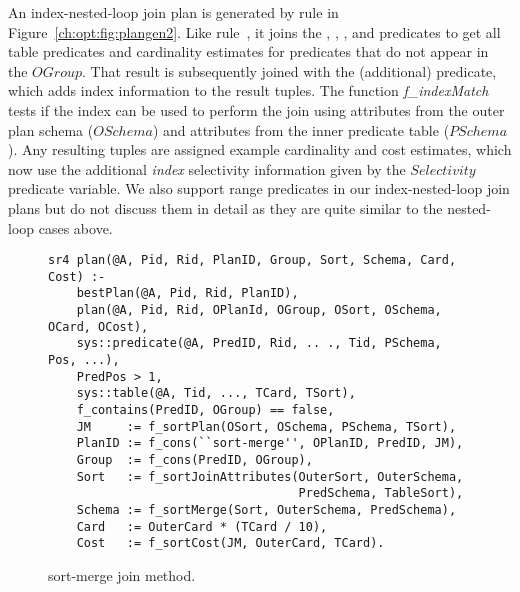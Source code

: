 An index-nested-loop join plan is generated by rule  in
Figure~\ref{ch:opt:fig:plangen2}.  Like rule~, it joins the
, , , and  predicates
to get all table predicates and cardinality estimates for predicates that do
not appear in the $OGroup$.  That result is subsequently joined with the
(additional)  predicate, which adds index information to the
result tuples.  The function {\em f\_indexMatch} tests if the index can be used
to perform the join using attributes from the outer plan schema ($OSchema$) and
attributes from the inner predicate table ($PSchema$).  Any resulting tuples
are assigned example cardinality and cost estimates, which now use the
additional {\em index} selectivity information given by the $Selectivity$
 predicate variable.  We also support range predicates in our
index-nested-loop join plans but do not discuss them in detail as they are
quite similar to the nested-loop cases above.

\begin{figure*}
\ssp
\centering
\begin{lstlisting}
sr4 plan(@A, Pid, Rid, PlanID, Group, Sort, Schema, Card, Cost) :-
    bestPlan(@A, Pid, Rid, PlanID),
    plan(@A, Pid, Rid, OPlanId, OGroup, OSort, OSchema, OCard, OCost),
    sys::predicate(@A, PredID, Rid, .. ., Tid, PSchema, Pos, ...),
    PredPos > 1,
    sys::table(@A, Tid, ..., TCard, TSort),
    f_contains(PredID, OGroup) == false,
    JM     := f_sortPlan(OSort, OSchema, PSchema, TSort),
    PlanID := f_cons(``sort-merge'', OPlanID, PredID, JM),
    Group  := f_cons(PredID, OGroup),
    Sort   := f_sortJoinAttributes(OuterSort, OuterSchema, 
                                   PredSchema, TableSort),
    Schema := f_sortMerge(Sort, OuterSchema, PredSchema),
    Card   := OuterCard * (TCard / 10),
    Cost   := f_sortCost(JM, OuterCard, TCard).
\end{lstlisting}
\caption{\label{ch:opt:fig:plangen3}sort-merge join method.}
\end{figure*}

